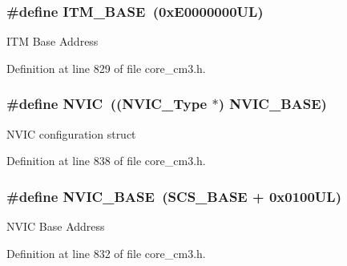 \hypertarget{group___c_m_s_i_s__core__register_gadd76251e412a195ec0a8f47227a8359e}{
\subsubsection[{\-I\-T\-M\-\_\-\-B\-A\-S\-E}]{\setlength{\rightskip}{0pt plus 5cm}\#define {\bf \-I\-T\-M\-\_\-\-B\-A\-S\-E}~(0x\-E0000000\-U\-L)}}\label{group___c_m_s_i_s__core__register_gadd76251e412a195ec0a8f47227a8359e}
\-I\-T\-M \-Base \-Address 

\-Definition at line 829 of file core\-\_\-cm3.\-h.

\hypertarget{group___c_m_s_i_s__core__register_gac8e97e8ce56ae9f57da1363a937f8a17}{
\subsubsection[{\-N\-V\-I\-C}]{\setlength{\rightskip}{0pt plus 5cm}\#define {\bf \-N\-V\-I\-C}~(({\bf \-N\-V\-I\-C\-\_\-\-Type} $\ast$)          {\bf \-N\-V\-I\-C\-\_\-\-B\-A\-S\-E})}}\label{group___c_m_s_i_s__core__register_gac8e97e8ce56ae9f57da1363a937f8a17}
\-N\-V\-I\-C configuration struct 

\-Definition at line 838 of file core\-\_\-cm3.\-h.

\hypertarget{group___c_m_s_i_s__core__register_gaa0288691785a5f868238e0468b39523d}{
\subsubsection[{\-N\-V\-I\-C\-\_\-\-B\-A\-S\-E}]{\setlength{\rightskip}{0pt plus 5cm}\#define {\bf \-N\-V\-I\-C\-\_\-\-B\-A\-S\-E}~({\bf \-S\-C\-S\-\_\-\-B\-A\-S\-E} +  0x0100\-U\-L)}}\label{group___c_m_s_i_s__core__register_gaa0288691785a5f868238e0468b39523d}
\-N\-V\-I\-C \-Base \-Address 

\-Definition at line 832 of file core\-\_\-cm3.\-h.

